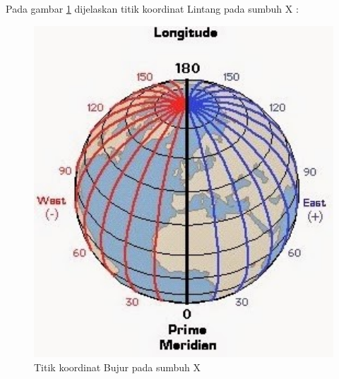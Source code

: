 Pada gambar \ref{bujur} dijelaskan titik koordinat Lintang pada sumbuh X :
\begin{figure}[ht]
	\centerline{\includegraphics[width=1\textwidth]{figures/bujur.JPG}}
	\caption{Titik koordinat Bujur pada sumbuh X}
	\label{bujur}
	\end{figure}